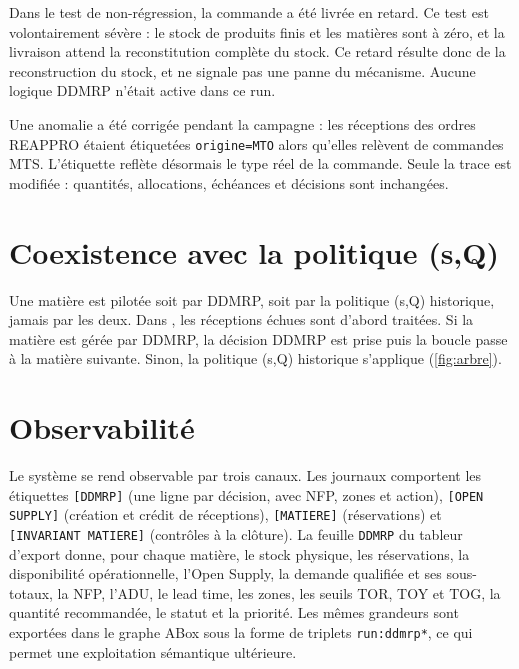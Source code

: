 Dans le test de non-régression, la commande a été livrée en retard. Ce test est volontairement sévère :
le stock de produits finis et les matières sont à zéro, et la livraison attend la reconstitution complète du
stock. Ce retard résulte donc de la reconstruction du stock, et ne signale pas une panne du mécanisme. Aucune
logique DDMRP n'était active dans ce run.

Une anomalie a été corrigée pendant la campagne : les réceptions des ordres REAPPRO étaient étiquetées
\texttt{origine=MTO} alors qu'elles relèvent de commandes MTS. L'étiquette reflète désormais le type réel de
la commande. Seule la trace est modifiée : quantités, allocations, échéances et décisions sont inchangées.

\section{Coexistence avec la politique (s,Q)}

Une matière est pilotée soit par DDMRP, soit par la politique (s,Q) historique, jamais par les deux. Dans
, les réceptions échues sont d'abord traitées. Si la matière est gérée par DDMRP,
la décision DDMRP est prise puis la boucle passe à la matière suivante. Sinon, la politique (s,Q) historique
s'applique (\cref{fig:arbre}).



\section{Observabilité}

Le système se rend observable par trois canaux. Les journaux comportent les étiquettes \texttt{[DDMRP]} (une
ligne par décision, avec NFP, zones et action), \texttt{[OPEN SUPPLY]} (création et crédit de réceptions),
\texttt{[MATIERE]} (réservations) et \texttt{[INVARIANT MATIERE]} (contrôles à la clôture). La feuille
\texttt{DDMRP} du tableur d'export donne, pour chaque matière, le stock physique, les réservations, la
disponibilité opérationnelle, l'Open Supply, la demande qualifiée et ses sous-totaux, la NFP, l'ADU, le lead
time, les zones, les seuils TOR, TOY et TOG, la quantité recommandée, le statut et la priorité. Les mêmes
grandeurs sont exportées dans le graphe ABox sous la forme de triplets \texttt{run:ddmrp*}, ce qui permet
une exploitation sémantique ultérieure.
